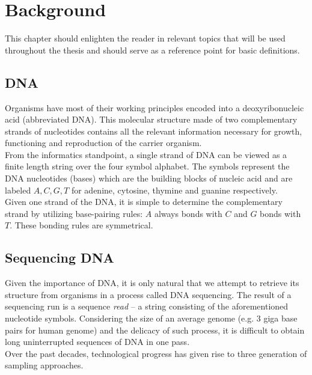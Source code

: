 \chapter{Background}

This chapter should enlighten the reader in relevant topics that will be used throughout the thesis and should serve as a reference point for basic definitions.

\section{DNA}
Organisms have most of their working principles encoded into a deoxyribonucleic acid (abbreviated DNA). This molecular structure made of two complementary strands of nucleotides contains all the relevant information necessary for growth, functioning and reproduction of the carrier organism.\\

From the informatics standpoint, a single strand of DNA can be viewed as a finite length string over the four symbol alphabet. The symbols represent the DNA nucleotides (bases) which are the building blocks of nucleic acid and are labeled $A,C,G,T$ for adenine, cytosine, thymine and guanine respectively.\\

Given one strand of the DNA, it is simple to determine the complementary strand by utilizing base-pairing rules: $A$ always bonds with $C$ and $G$ bonds with $T$. These bonding rules are symmetrical.

\section{Sequencing DNA}
Given the importance of DNA, it is only natural that we attempt to retrieve its structure from organisms in a process called DNA sequencing. The result of a sequencing run is a sequence \emph{read} -- a string consisting of the aforementioned nucleotide symbols. Considering the size of an average genome (e.g. 3 giga base pairs for human genome) and the delicacy of such process, it is difficult to obtain long uninterrupted sequences of DNA in one pass. \\
Over the past decades, technological progress has given rise to three generation of sampling approaches.


